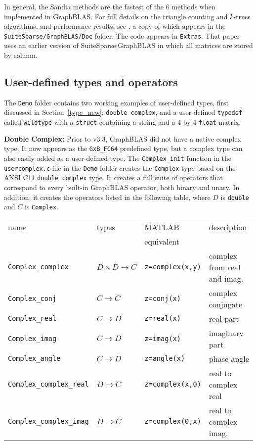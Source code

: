 \documentclass[12pt]{article}
\begin{document}
In general, the Sandia methods are the fastest of the 6 methods when
implemented in GraphBLAS.  For full details on the triangle counting and
$k$-truss algorithms, and performance results, see \cite{Davis18b}, a copy of
which appears in the \verb'SuiteSparse/GraphBLAS/Doc' folder.  The code appears
in \verb'Extras'.  That paper uses an earlier version of SuiteSparse:GraphBLAS
in which all matrices are stored by column.

\newpage
\subsection{User-defined types and operators}
\label{user}

The \verb'Demo' folder contains two working examples of user-defined types,
first discussed in Section~\ref{type_new}: \verb'double complex', and a
user-defined \verb'typedef' called \verb'wildtype' with a \verb'struct'
containing a string and a 4-by-4 \verb'float' matrix.

{\bf Double Complex:}
Prior to v3.3, GraphBLAS did not have a native complex type.  It now appears as
the \verb'GxB_FC64' predefined type, but a complex type can also easily added
as a user-defined type.  The \verb'Complex_init' function in the
\verb'usercomplex.c' file in the \verb'Demo' folder creates the \verb'Complex'
type based on the ANSI C11 \verb'double complex' type.
It creates a full suite of operators that correspond to every
built-in GraphBLAS operator, both binary and unary.  In addition, it
creates the operators listed in the following table, where $D$ is
\verb'double' and $C$ is \verb'Complex'.

\vspace{0.1in}
{\footnotesize
\begin{tabular}{llll}
\hline
name                    & types             & MATLAB        & description \\
                        &                   & equivalent    & \\
\hline
\verb'Complex_complex'  & $D \times D \rightarrow C$ & \verb'z=complex(x,y)' & complex from real and imag. \\
\hline
\verb'Complex_conj'     & $C \rightarrow C$ & \verb'z=conj(x)'  & complex conjugate \\
\verb'Complex_real'     & $C \rightarrow D$ & \verb'z=real(x)'  & real part \\
\verb'Complex_imag'     & $C \rightarrow D$ & \verb'z=imag(x)'  & imaginary part \\
\verb'Complex_angle'    & $C \rightarrow D$ & \verb'z=angle(x)' & phase angle \\
\verb'Complex_complex_real'  & $D \rightarrow C$ & \verb'z=complex(x,0)' & real to complex real \\
\verb'Complex_complex_imag'  & $D \rightarrow C$ & \verb'z=complex(0,x)' & real to complex imag. \\
\hline
\end{tabular}
}
\end{document}
